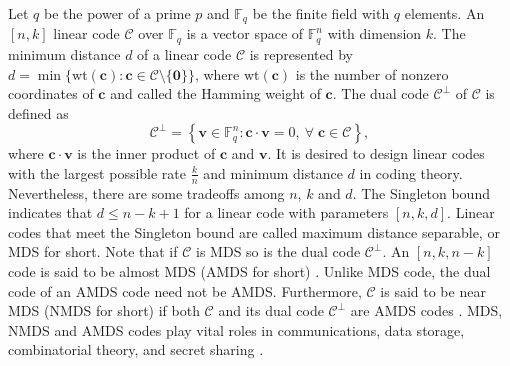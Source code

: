 \documentclass[10pt]{article}%
\begin{document}
	Let $q$ be the power of a prime $p$ and $\mathbb{F}_q$ be the finite field with $q$ elements. An $[n,k]$ linear code $\mathcal{C}$ over $\mathbb{F}_q$ is a vector space of $\mathbb{F}_q^n$ with dimension $k$. The minimum distance $d$ of a linear code $\mathcal{C}$ is represented by $d=\min\{\mathrm{wt}(\mathbf{c}):\mathbf{c}\in\mathcal{C}\setminus \{\mathbf{0}\}\}$, where $\mathrm{wt}(\mathbf{c})$ is the number of nonzero coordinates of $\mathbf{c}$ and called the Hamming weight of $\mathbf{c}$. The dual code $\mathcal{C}^\perp$ of $\mathcal{C}$ is defined as 
	\begin{equation*}
		\mathcal{C}^\perp=\left\{\mathbf{v}\in\mathbb{F}_q^n:\mathbf{c}\cdot\mathbf{v}=0,\ \forall\;\mathbf{c}\in\mathcal{C}\right\},
	\end{equation*}
	where $\mathbf{c}\cdot\mathbf{v}$ is the inner product of $\mathbf{c}$ and $\mathbf{v}$. It is desired to design linear codes with the largest possible rate $\frac{k}{n}$ and minimum distance $d$ in coding theory. Nevertheless, there are some tradeoffs among $n$, $k$ and $d$. The Singleton bound indicates that $d\le n-k+1$ for a linear  code with parameters $[n,k,d]$. Linear codes that meet the Singleton bound are called maximum distance separable, or MDS for short. Note that if $\mathcal{C}$ is MDS so is the dual code $\mathcal{C}^\perp$. An $[n,k,n-k]$ code is said to be almost MDS (AMDS for short) \cite{Boer1996AlmostMDSCodes}. Unlike MDS code, the dual code of an AMDS code need not be AMDS. Furthermore, $\mathcal{C}$ is said to be near MDS (NMDS for short) if both $\mathcal{C}$ and its dual code $\mathcal{C}^\perp$ are AMDS codes \cite{Dodunekov1995NearMDSCodes}. MDS, NMDS and AMDS codes play vital roles in communications, data storage, combinatorial theory, and secret sharing \cite{Ding2020InfiniteFamiliesMDS,Tang2021InfiniteFamilyLinear,Heng2023NewInfiniteFamilies,Dodunekova1997AlmostMDSNearMDSCodes,Zhou2009SecretSharingScheme}.
	
\end{document}
